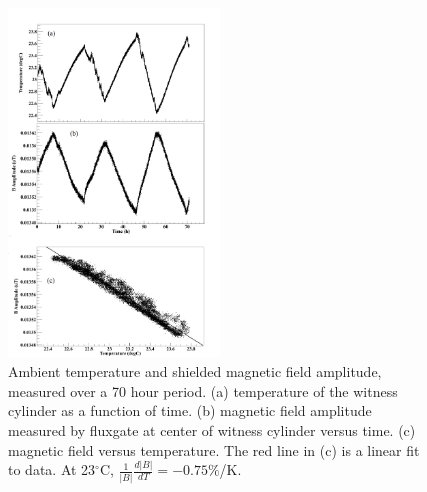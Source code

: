 
\begin{figure}
\begin{center}
   \includegraphics[width=0.5\textwidth]{B_vs_T_solenoid.png}
    \caption{Ambient temperature and shielded magnetic field
      amplitude, measured over a 70 hour period. (a) temperature of
      the witness cylinder as a function of time.  (b) magnetic field
      amplitude measured by fluxgate at center of witness cylinder
      versus time.  (c) magnetic field versus temperature. The red
      line in (c) is a linear fit to data. At 23$^\circ$C,
      $\frac{1}{|B|}\frac{d|B|}{dT}=-0.75\%$/K.}
    \label{fig:B_vs_Temp}
    \end{center}
\end{figure} 


